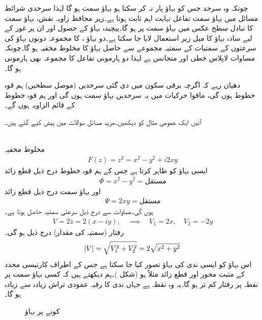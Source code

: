 چونکہ وہ سرحد جس کو بہاؤ پار نہ کر سکتا ہو بہاؤ سمت ہو گا لہٰذا سرحدی شرائط مسائل میں بہاؤ سمت تفاعل  نہایت اہم  ثابت ہوتا ہے۔زیر محافظ زاویہ نقش، بہاؤ سمت کا تبادل سطح عکس میں بہاؤ سمت پر ہو گا۔پیچیدہ بہاؤ کے حصول اور ان پر غور کے لیے سادہ بہاؤ کا میل زیر استعمال لایا جا سکتا ہے۔دو بہاؤ ،  کا مجموعہ  دونوں بہاؤ کی   سرعتوں کے سمتیات کے سمتیہ مجموعے  سے حاصل بہاؤ کا مخلوط مخفیہ ہو گا۔چونکہ مساوات لاپلاس خطی اور متجانس ہے  لہٰذا دو ہارمونی تفاعل کا مجموعہ بھی  ہارمونی ہو گا۔

دھیان رہے کہ اگرچہ برقی سکون میں دی گئی سرحدیں (موصل سطحیں) ہم قوہ خطوط ہوں گی، ماقوا حرکیات میں یہ سرحدیں بہاؤ سمت ہوں گی اور ہم قوہ خطوط کے قائم الزاویہ ہوں گے۔    

آئیں ایک عمومی مثال کو دیکھیں۔مزید مسائل سوالات میں پیش کیے گئے ہیں۔

\quad {}\\
مخلوط مخفیہ 
\begin{align}
F(z)=z^2=x^2-y^2+i2xy
\end{align}
ایسی بہاؤ کو ظاہر کرتا ہے  جس کے ہم قوہ خطوط درج ذیل  قطع زائد
\begin{align*}
\Phi=x^2-y^2=\text{مستقل}
\end{align*}
اور بہاؤ سمت درج ذیل  قطع زائد
\begin{align*}
\Psi=2xy=\text{مستقل}
\end{align*}
ہوں گی۔مساوات  سے درج ذیل سرعتی  سمتیہ حاصل ہوتا ہے۔
\begin{align*}
V=2\bar{z}=2(x-iy),\quad \implies\quad V_1=2x,\quad V_2=-2y
\end{align*}
رفتار (سمتیہ کی مقدار) درج ذیل ہو گی۔
\begin{align*}
\abs{V}=\sqrt{V_1^2+V_2^2}=2\sqrt{x^2+y^2}
\end{align*}
اس بہاؤ کو ایسی ندی کی بہاؤ تصور کیا جا سکتا ہے جس کے اطراف کارتیسی محدد کے مثبت محور اور قطع زائد مثلاً  ہو (شکل )۔ہم دیکھتے ہیں کہ کسی بہاؤ سمت  پر  نقطہ  پر رفتار کم تر ہو گا۔یہ وہ نقطہ ہے جہاں ندی کا رقبہ  عمودی تراش  زیادہ سے زیادہ ہو گا۔
\begin{figure}
\centering
{}
\caption{کونے پر بہاؤ}
\label{شکل_مخفی_قوہ_کونے_پر_بہاو}
\end{figure}

